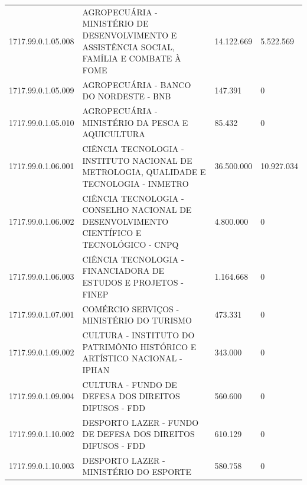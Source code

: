 \documentclass{article}
\begin{document}
\begin{longtable}[c]{m{2cm}|m{11cm}|m{2cm}m{2cm}}
\multicolumn{1}{C{2cm}|}{1717.99.0.1.05.008} & \multicolumn{1}{L{11cm}|}{AGROPECUÁRIA - MINISTÉRIO DE DESENVOLVIMENTO E ASSISTÊNCIA SOCIAL, FAMÍLIA E COMBATE À FOME} & \multicolumn{1}{R{2cm}|}{14.122.669} & \multicolumn{1}{R{2cm}}{5.522.569} \\
\multicolumn{1}{C{2cm}|}{1717.99.0.1.05.009} & \multicolumn{1}{L{11cm}|}{AGROPECUÁRIA - BANCO DO NORDESTE - BNB} & \multicolumn{1}{R{2cm}|}{147.391} & \multicolumn{1}{R{2cm}}{            0} \\
\multicolumn{1}{C{2cm}|}{1717.99.0.1.05.010} & \multicolumn{1}{L{11cm}|}{AGROPECUÁRIA - MINISTÉRIO DA PESCA E AQUICULTURA} & \multicolumn{1}{R{2cm}|}{85.432} & \multicolumn{1}{R{2cm}}{            0} \\
\multicolumn{1}{C{2cm}|}{1717.99.0.1.06.001} & \multicolumn{1}{L{11cm}|}{CIÊNCIA TECNOLOGIA - INSTITUTO NACIONAL DE METROLOGIA, QUALIDADE E TECNOLOGIA - INMETRO} & \multicolumn{1}{R{2cm}|}{36.500.000} & \multicolumn{1}{R{2cm}}{10.927.034} \\
\multicolumn{1}{C{2cm}|}{1717.99.0.1.06.002} & \multicolumn{1}{L{11cm}|}{CIÊNCIA TECNOLOGIA - CONSELHO NACIONAL DE DESENVOLVIMENTO CIENTÍFICO E TECNOLÓGICO - CNPQ} & \multicolumn{1}{R{2cm}|}{4.800.000} & \multicolumn{1}{R{2cm}}{            0} \\
\multicolumn{1}{C{2cm}|}{1717.99.0.1.06.003} & \multicolumn{1}{L{11cm}|}{CIÊNCIA TECNOLOGIA - FINANCIADORA DE ESTUDOS E PROJETOS - FINEP} & \multicolumn{1}{R{2cm}|}{1.164.668} & \multicolumn{1}{R{2cm}}{            0} \\
\multicolumn{1}{C{2cm}|}{1717.99.0.1.07.001} & \multicolumn{1}{L{11cm}|}{COMÉRCIO SERVIÇOS - MINISTÉRIO DO TURISMO} & \multicolumn{1}{R{2cm}|}{473.331} & \multicolumn{1}{R{2cm}}{            0} \\
\multicolumn{1}{C{2cm}|}{1717.99.0.1.09.002} & \multicolumn{1}{L{11cm}|}{CULTURA - INSTITUTO DO PATRIMÔNIO HISTÓRICO E ARTÍSTICO NACIONAL - IPHAN} & \multicolumn{1}{R{2cm}|}{343.000} & \multicolumn{1}{R{2cm}}{            0} \\
\multicolumn{1}{C{2cm}|}{1717.99.0.1.09.004} & \multicolumn{1}{L{11cm}|}{CULTURA - FUNDO DE DEFESA DOS DIREITOS DIFUSOS - FDD} & \multicolumn{1}{R{2cm}|}{560.600} & \multicolumn{1}{R{2cm}}{            0} \\
\multicolumn{1}{C{2cm}|}{1717.99.0.1.10.002} & \multicolumn{1}{L{11cm}|}{DESPORTO LAZER - FUNDO DE DEFESA DOS DIREITOS DIFUSOS - FDD} & \multicolumn{1}{R{2cm}|}{610.129} & \multicolumn{1}{R{2cm}}{            0} \\
\multicolumn{1}{C{2cm}|}{1717.99.0.1.10.003} & \multicolumn{1}{L{11cm}|}{DESPORTO LAZER - MINISTÉRIO DO ESPORTE} & \multicolumn{1}{R{2cm}|}{580.758} & \multicolumn{1}{R{2cm}}{            0} \\

\end{longtable}
\end{document}
